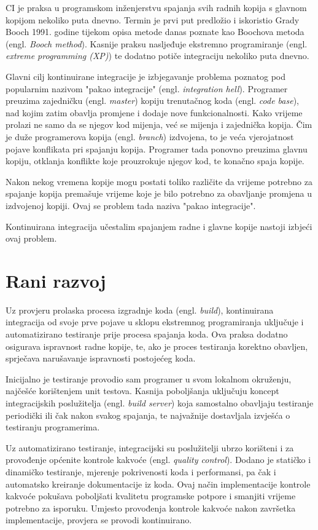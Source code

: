 \documentclass[times, utf8, seminar, numeric]{fer}
\newcommand{\eng}[1]{(engl. \textit{#1})}
\begin{document}
CI je praksa u programskom inženjerstvu spajanja svih radnih kopija s glavnom kopijom nekoliko puta dnevno. Termin je prvi put predložio i iskoristio Grady Booch 1991. godine tijekom opisa metode danas poznate kao Boochova metoda \eng{Booch method}\citep{wiki:BoochMethod}. Kasnije praksu nasljeđuje ekstremno programiranje \eng{extreme programming (XP)} te dodatno potiče integraciju nekoliko puta dnevno\citep{wiki:CI}.

Glavni cilj kontinuirane integracije je izbjegavanje problema poznatog pod popularnim nazivom "pakao integracije" \eng{integration hell}. Programer preuzima zajedničku \eng{master} kopiju trenutačnog koda \eng{code base}, nad kojim zatim obavlja promjene i dodaje nove funkcionalnosti. Kako vrijeme prolazi ne samo da se njegov kod mijenja, već se mijenja i zajednička kopija. Čim je duže programerova kopija \eng{branch} izdvojena, to je veća vjerojatnost pojave konflikata pri spajanju kopija. Programer tada ponovno preuzima glavnu kopiju, otklanja konflikte koje prouzrokuje njegov kod, te konačno spaja kopije.

Nakon nekog vremena kopije mogu postati toliko različite da vrijeme potrebno za spajanje kopija premašuje vrijeme koje je bilo potrebno za obavljanje promjena u izdvojenoj kopiji. Ovaj se problem tada naziva "pakao integracije". 

Kontinuirana integracija učestalim spajanjem radne i glavne kopije nastoji izbjeći ovaj problem.

\section{Rani razvoj}
Uz provjeru prolaska procesa izgradnje koda \eng{build}, kontinuirana integracija od svoje prve pojave u sklopu ekstremnog programiranja uključuje i automatizirano testiranje prije procesa spajanja koda. Ova praksa dodatno osigurava ispravnost radne kopije, te, ako je proces testiranja korektno obavljen, sprječava narušavanje ispravnosti postojećeg koda.

Inicijalno je testiranje provodio sam programer u svom lokalnom okruženju, najčešće korištenjem unit testova. Kasnija poboljšanja uključuju koncept integracijskih poslužitelja \eng{build server} koja samostalno obavljaju testiranje periodički ili čak nakon svakog spajanja, te najvažnije dostavljala izvješća 
o testiranju programerima. 

Uz automatizirano testiranje, integracijski su poslužitelji ubrzo korišteni i za provođenje općenite kontrole kakvoće \eng{quality control}. Dodano je statičko i dinamičko testiranje, mjerenje pokrivenosti koda i performansi, pa čak i automatsko kreiranje dokumentacije iz koda. Ovaj način implementacije kontrole kakvoće pokušava poboljšati kvalitetu programske potpore i smanjiti vrijeme potrebno za isporuku. Umjesto provođenja kontrole kakvoće nakon završetka implementacije, provjera se provodi kontinuirano. 
\end{document}
